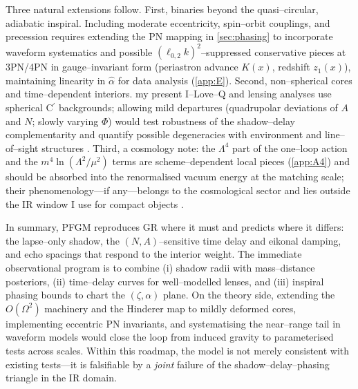 \documentclass{iopjournal}
\begin{document}
Three natural extensions follow. First, binaries beyond the quasi–circular, adiabatic inspiral. Including moderate eccentricity, spin–orbit couplings, and precession requires extending the PN mapping in \cref{sec:phasing} to incorporate waveform systematics and possible $(\ell_{0,2}k)^2$–suppressed conservative pieces at 3PN/4PN in gauge–invariant form (periastron advance $K(x)$, redshift $z_1(x)$), maintaining linearity in $\widehat\alpha$ for data analysis (\cref{app:E}). Second, non–spherical cores and time–dependent interiors. my present I–Love–Q and lensing analyses use spherical C$^\prime$ backgrounds; allowing mild departures (quadrupolar deviations of $A$ and $N$; slowly varying $\Phi$) would test robustness of the shadow–delay complementarity and quantify possible degeneracies with environment and line–of–sight structures \cite{Perlick2004LRR}. Third, a cosmology note: the $\Lambda^4$ part of the one–loop action and the $m^4\ln(\Lambda^2/\mu^2)$ terms are scheme–dependent local pieces (\cref{app:A4}) and should be absorbed into the renormalised vacuum energy at the matching scale; their phenomenology—if any—belongs to the cosmological sector and lies outside the IR window I use for compact objects \cite{ParkerToms,Donoghue1994}.

In summary, PFGM reproduces GR where it must and predicts where it differs: the lapse–only shadow, the $(N,A)$–sensitive time delay and eikonal damping, and echo spacings that respond to the interior weight. The immediate observational program is to combine (i) shadow radii with mass–distance posteriors, (ii) time–delay curves for well–modelled lenses, and (iii) inspiral phasing bounds to chart the $(\zeta,\alpha)$ plane. On the theory side, extending the $O(\Omega^2)$ machinery and the Hinderer map to mildly deformed cores, implementing eccentric PN invariants, and systematising the near–range tail in waveform models would close the loop from induced gravity to parameterised tests across scales. Within this roadmap, the model is not merely consistent with existing tests—it is falsifiable by a \emph{joint} failure of the shadow–delay–phasing triangle in the IR domain.




\end{document}
